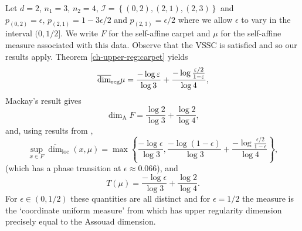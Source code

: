Let $d=2$, $n_1=3$, $n_2=4$,  $\mathcal{I}=\left\{(0,2),(2,1),(2,3)\right\}$ and $p_{(0,2)}=\epsilon,\, p_{(2,1)}=1-3\epsilon/2$ and $p_{(2,3)}=\epsilon/2$ where we allow $\epsilon$ to vary in the interval $(0,1/2]$.  We write $F$ for the self-affine carpet and $\mu$ for the self-affine measure associated with this data.  Observe that the VSSC is satisfied and so our results apply.  Theorem \ref{ch-upper-reg:carpet} yields
\[
\overline{\dim}_{\textup{reg}} \mu = \frac{-\log \varepsilon}{\log 3}+ \frac{-\log \frac{\varepsilon/2}{1-\varepsilon} }{\log 4},
\]
Mackay's result \cite{mackay} gives
\[
\dim_{\text{A}} F = \frac{\log 2}{ \log 3} + \frac{ \log 2}{ \log 4}, 
\]
and, using results from \cite{sponges},
\[
\sup_{x\in F} \overline{\dim}_{\text{loc}}(x,\mu)=\max\left\{ \frac{-\log \epsilon}{\log 3} , \frac{-\log (1-\epsilon)}{\log 3}+\frac{-\log \frac{\epsilon/2}{1-\epsilon} }{\log 4}\right\},
\]
(which has a phase transition at $\epsilon \approx 0.066$), and
\[
T(\mu)= \frac{-\log \epsilon }{\log 3} +\frac{\log 2}{\log 4} .
\]
For $\epsilon \in (0,1/2)$  these quantities are all distinct and for $\epsilon=1/2$ the measure is the `coordinate uniform measure' from \cite{fraser-howroyd} which has upper regularity dimension precisely equal to the Assouad dimension.



